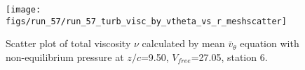 \begin{figure}[H]
\centering
\texttt{[image: figs/run\_57/run\_57\_turb\_visc\_by\_vtheta\_vs\_r\_meshscatter]}
\caption{Scatter plot of total viscosity $\nu$ calculated by mean $\bar{v}_{\theta}$ equation with non-equilibrium pressure at $z/c$=9.50, $V_{free}$=27.05, station 6.}
\label{fig:run_57_turb_visc_by_vtheta_vs_r_meshscatter}
\end{figure}


